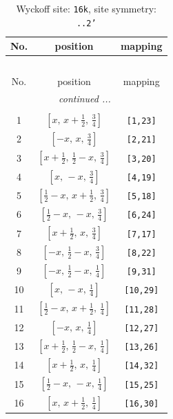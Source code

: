 \documentclass[fleqn,8pt]{jsarticle}
\begin{document}
\renewcommand{\arraystretch}{1.2}
\begin{longtable}{ccc}
\caption{Wyckoff site: {\tt 16k}, site symmetry: {\tt ..2'}}
 \\
 \hline \hline
No. & position & mapping \\ \hline \endfirsthead

\multicolumn{2}{l}{\tablename\ \thetable{}} \\
 \hline \hline
No. & position & mapping \\ \hline \endhead

 \hline \hline
\multicolumn{2}{r}{\footnotesize\it continued ...} \\ \endfoot

 \hline \hline
\multicolumn{2}{r}{} \\ \endlastfoot

1 & $\left[ x,\, x + \frac{1}{2},\, \frac{3}{4} \right]$ & {\tt [1,23]} \\ \hline
2 & $\left[ - x,\, x,\, \frac{3}{4} \right]$ & {\tt [2,21]} \\ \hline
3 & $\left[ x + \frac{1}{2},\, \frac{1}{2} - x,\, \frac{3}{4} \right]$ & {\tt [3,20]} \\ \hline
4 & $\left[ x,\, - x,\, \frac{3}{4} \right]$ & {\tt [4,19]} \\ \hline
5 & $\left[ \frac{1}{2} - x,\, x + \frac{1}{2},\, \frac{3}{4} \right]$ & {\tt [5,18]} \\ \hline
6 & $\left[ \frac{1}{2} - x,\, - x,\, \frac{3}{4} \right]$ & {\tt [6,24]} \\ \hline
7 & $\left[ x + \frac{1}{2},\, x,\, \frac{3}{4} \right]$ & {\tt [7,17]} \\ \hline
8 & $\left[ - x,\, \frac{1}{2} - x,\, \frac{3}{4} \right]$ & {\tt [8,22]} \\ \hline
9 & $\left[ - x,\, \frac{1}{2} - x,\, \frac{1}{4} \right]$ & {\tt [9,31]} \\ \hline
10 & $\left[ x,\, - x,\, \frac{1}{4} \right]$ & {\tt [10,29]} \\ \hline
11 & $\left[ \frac{1}{2} - x,\, x + \frac{1}{2},\, \frac{1}{4} \right]$ & {\tt [11,28]} \\ \hline
12 & $\left[ - x,\, x,\, \frac{1}{4} \right]$ & {\tt [12,27]} \\ \hline
13 & $\left[ x + \frac{1}{2},\, \frac{1}{2} - x,\, \frac{1}{4} \right]$ & {\tt [13,26]} \\ \hline
14 & $\left[ x + \frac{1}{2},\, x,\, \frac{1}{4} \right]$ & {\tt [14,32]} \\ \hline
15 & $\left[ \frac{1}{2} - x,\, - x,\, \frac{1}{4} \right]$ & {\tt [15,25]} \\ \hline
16 & $\left[ x,\, x + \frac{1}{2},\, \frac{1}{4} \right]$ & {\tt [16,30]} \\
\end{longtable}
\end{document}
